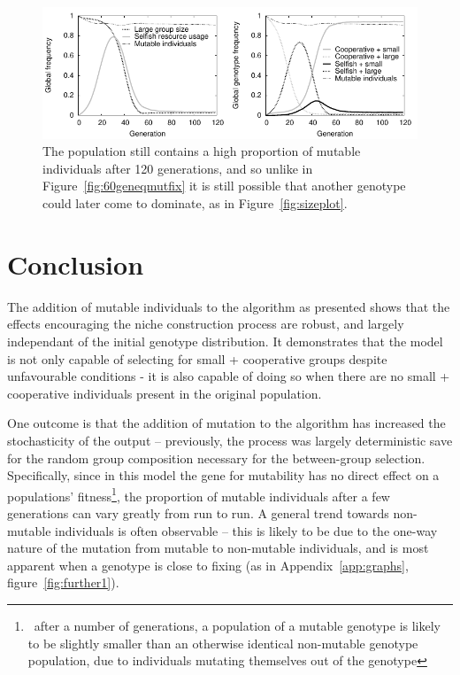 \documentclass[11pt]{article}
\begin{document}
\begin{figure}[!ht]
  \centering
  \includegraphics{120geninteresting.pdf}
  \caption{The population still contains a high proportion of mutable individuals after 120 generations, and so unlike in Figure~\ref{fig:60geneqmutfix} it is still possible that another genotype could later come to dominate, as in Figure~\ref{fig:sizeplot}.}
  \label{fig:120geninteresting}
\end{figure}

\section{Conclusion}
The addition of mutable individuals to the algorithm as presented shows that the effects encouraging the niche construction process are robust, and largely independant of the initial genotype distribution.
It demonstrates that the model is not only capable of selecting for small + cooperative groups despite unfavourable conditions - it is also capable of doing so when there are no small + cooperative individuals present in the original population.

One outcome is that the addition of mutation to the algorithm has increased the stochasticity of the output -- previously, the process was largely deterministic save for the random group composition necessary for the between-group selection. Specifically, since in this model the gene for mutability has no direct effect on a populations' fitness\footnote{~after a number of generations, a population of a mutable genotype is likely to be slightly smaller than an otherwise identical non-mutable genotype population, due to individuals mutating themselves out of the genotype}, the proportion of mutable individuals after a few generations can vary greatly from run to run. A general trend towards non-mutable individuals is often observable -- this is likely to be due to the one-way nature of the mutation from mutable to non-mutable individuals, and is most apparent when a genotype is close to fixing (as in Appendix~\ref{app:graphs}, figure~\ref{fig:further1}).
\end{document}
